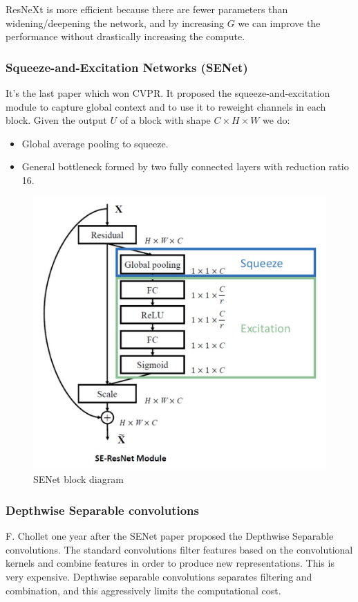 \documentclass{article}
\begin{document}
ResNeXt is more efficient because there are fewer parameters than widening/deepening the network, and by increasing $G$ we can improve the performance without drastically increasing the compute.

\subsubsection{Squeeze-and-Excitation Networks (SENet)}
It's the last paper which won CVPR.
It proposed the squeeze-and-excitation module to capture global context and to use it to reweight channels in each block.
Given the output $U$ of a block with shape $C \times H \times W$ we do:
\begin{itemize}
  \item Global average pooling to squeeze.
  \item General bottleneck formed by two fully connected layers with reduction ratio 16.
\end{itemize}

\begin{figure}[htbp]
  \centering
  \includegraphics[width=0.8\linewidth]{./img/senet.jpg}
  \caption{SENet block diagram}
\end{figure}

\subsubsection{Depthwise Separable convolutions}
F. Chollet one year after the SENet paper proposed the Depthwise Separable convolutions.
The standard convolutions filter features based on the convolutional kernels and combine features in order to produce new representations.
This is very expensive.
Depthwise separable convolutions separates filtering and combination, and this aggressively limits the computational cost.
\end{document}
